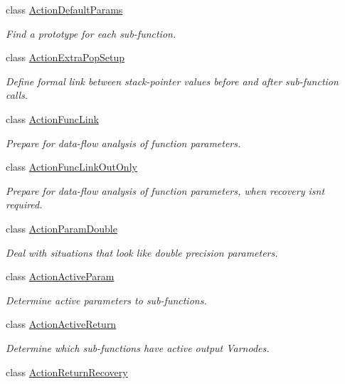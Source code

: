 \begin{DoxyCompactItemize}
class \mbox{\hyperlink{class_action_default_params}{Action\+Default\+Params}}
\begin{DoxyCompactList}\small\item\em Find a prototype for each sub-\/function. \end{DoxyCompactList}\item 
class \mbox{\hyperlink{class_action_extra_pop_setup}{Action\+Extra\+Pop\+Setup}}
\begin{DoxyCompactList}\small\item\em Define formal link between stack-\/pointer values before and after sub-\/function calls. \end{DoxyCompactList}\item 
class \mbox{\hyperlink{class_action_func_link}{Action\+Func\+Link}}
\begin{DoxyCompactList}\small\item\em Prepare for data-\/flow analysis of function parameters. \end{DoxyCompactList}\item 
class \mbox{\hyperlink{class_action_func_link_out_only}{Action\+Func\+Link\+Out\+Only}}
\begin{DoxyCompactList}\small\item\em Prepare for data-\/flow analysis of function parameters, when recovery isn\textquotesingle{}t required. \end{DoxyCompactList}\item 
class \mbox{\hyperlink{class_action_param_double}{Action\+Param\+Double}}
\begin{DoxyCompactList}\small\item\em Deal with situations that look like double precision parameters. \end{DoxyCompactList}\item 
class \mbox{\hyperlink{class_action_active_param}{Action\+Active\+Param}}
\begin{DoxyCompactList}\small\item\em Determine active parameters to sub-\/functions. \end{DoxyCompactList}\item 
class \mbox{\hyperlink{class_action_active_return}{Action\+Active\+Return}}
\begin{DoxyCompactList}\small\item\em Determine which sub-\/functions have active output Varnodes. \end{DoxyCompactList}\item 
class \mbox{\hyperlink{class_action_return_recovery}{Action\+Return\+Recovery}}

\end{DoxyCompactItemize}

